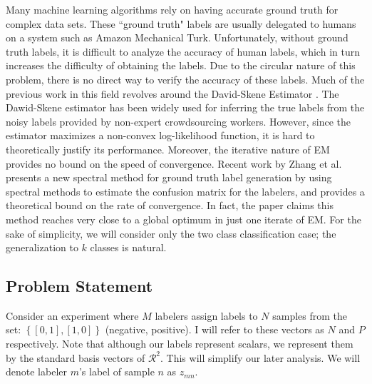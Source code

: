     Many machine learning algorithms rely on having accurate ground truth for complex data sets. These ``ground truth" labels are usually delegated to humans on a system such as Amazon Mechanical Turk. Unfortunately, without ground truth labels, it is difficult to analyze the accuracy of human labels, which in turn increases the difficulty of obtaining the labels. Due to the circular nature of this problem, there is no direct way to verify the accuracy of these labels. Much of the previous work in this field revolves around the David-Skene Estimator \cite{dawid1979maximum}. The Dawid-Skene estimator has been widely used for inferring the true labels from the noisy labels provided by non-expert crowdsourcing workers. However, since the estimator maximizes a non-convex log-likelihood function, it is hard to theoretically justify its performance. Moreover, the iterative nature of EM provides no bound on the speed of convergence.  Recent work by Zhang et al. \cite{zhang2014spectral} presents a new spectral method for ground truth label generation by using spectral methods to estimate the confusion matrix for the labelers, and provides a theoretical bound on the rate of convergence. In fact, the paper claims this method reaches very close to a global optimum in just one iterate of EM. For the sake of simplicity, we will consider only the two class classification case; the generalization to $k$ classes is natural.

\subsection{Problem Statement}
Consider an experiment where $M$ labelers assign labels to $N$ samples from the set: $\left\{[0,1],[1,0]\right\}$ (negative, positive). I will refer to these vectors as $N$ and $P$ respectively. Note that although our labels represent scalars, we represent them by the standard basis vectors of $\mathcal{R}^{2}$. This will simplify our later analysis. We will denote labeler $m$'s label of sample $n$ as $z_{mn}$.

